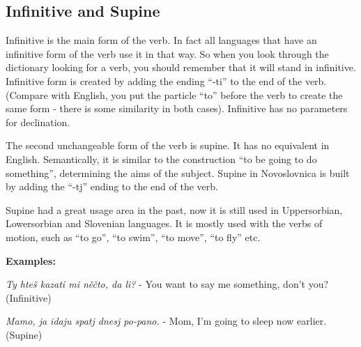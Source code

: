 \subsection{Infinitive and Supine}

Infinitive is the main form of the verb. In fact all languages that have an infinitive form of the verb use it in that way. So when you look through the dictionary looking for a verb, you should remember that it will stand in infinitive. Infinitive form is created by adding the ending “-ti” to the end of the verb. (Compare with English, you put the particle “to” before the verb to create the same form - there is some similarity in both cases). Infinitive has no parameters for declination.

The second unchangeable form of the verb is supine. It has no equivalent in English. Semantically, it is similar to the construction “to be going to do something”, determining the aims of the subject. Supine in Novoslovnica is built by adding the “-tj” ending to the end of the verb.

Supine had a great usage area in the past, now it is still used in Uppersorbian, Lowersorbian and Slovenian languages. It is mostly used with the verbs of motion, such as “to go”, “to swim”, “to move”, “to fly” etc.

\textbf{Examples:}

\textit{Ty hteš kazati mi něčto, da li?} - You want to say me something, don’t you? (Infinitive)

\textit{Mamo, ja idaju spatj dnesj po-pano.} - Mom, I’m going to sleep now earlier. (Supine)
